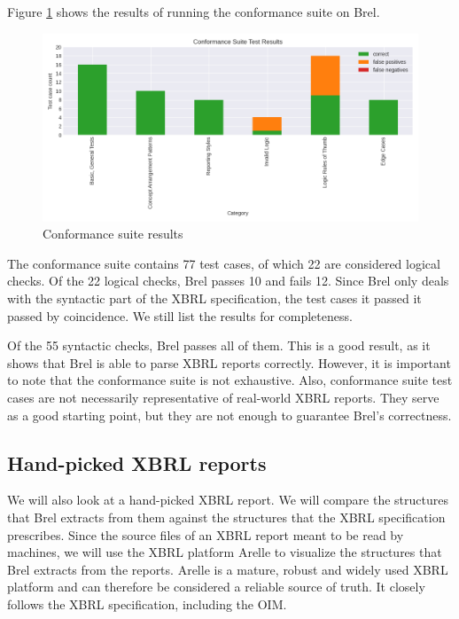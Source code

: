Figure \ref{fig:conformance_suite} shows the results of running the conformance suite on Brel.

\begin{figure}[H]
  \centering
  \includegraphics[width=1\textwidth]{images/seattle_method_test_results.png}
    \caption{Conformance suite results}
    \label{fig:conformance_suite}
\end{figure}

The conformance suite contains 77 test cases, of which 22 are considered logical checks.
Of the 22 logical checks, Brel passes 10 and fails 12.
Since Brel only deals with the syntactic part of the XBRL specification,
the test cases it passed it passed by coincidence.
We still list the results for completeness.

Of the 55 syntactic checks, Brel passes all of them.
This is a good result, as it shows that Brel is able to parse XBRL reports correctly.
However, it is important to note that the conformance suite is not exhaustive.
Also, conformance suite test cases are not necessarily representative of real-world XBRL reports.
They serve as a good starting point, but they are not enough to guarantee Brel's correctness.

\subsection{Hand-picked XBRL reports}

We will also look at a hand-picked XBRL report.
We will compare the structures that Brel extracts from them against the structures that the XBRL specification prescribes.
Since the source files of an XBRL report meant to be read by machines,
we will use the XBRL platform Arelle to visualize the structures that Brel extracts from the reports.
Arelle is a mature, robust and widely used XBRL platform and can therefore be considered a reliable source of truth.
It closely follows the XBRL specification, including the OIM.

